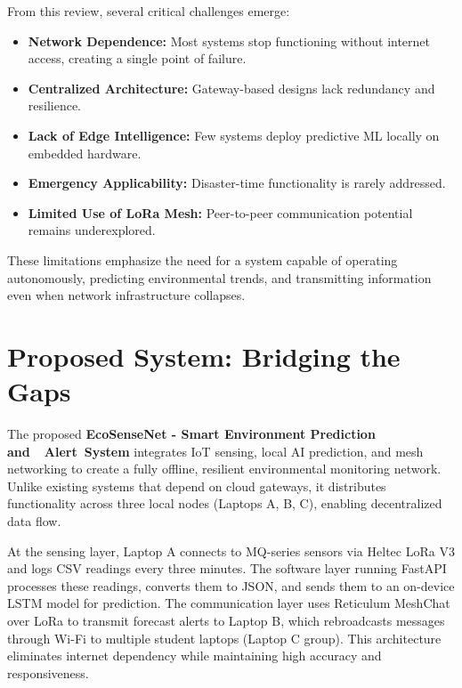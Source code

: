 From this review, several critical challenges emerge:
\begin{itemize}
    \item \textbf{Network Dependence:} Most systems stop functioning without internet access, creating a single point of failure.
    \item \textbf{Centralized Architecture:} Gateway-based designs lack redundancy and resilience.
    \item \textbf{Lack of Edge Intelligence:} Few systems deploy predictive ML locally on embedded hardware.
    \item \textbf{Emergency Applicability:} Disaster-time functionality is rarely addressed.
    \item \textbf{Limited Use of LoRa Mesh:} Peer-to-peer communication potential remains underexplored.
\end{itemize}

These limitations emphasize the need for a system capable of operating autonomously, predicting environmental trends, and transmitting information even when network infrastructure collapses.

\section{Proposed System: Bridging the Gaps}

The proposed \textbf{EcoSenseNet - Smart Environment Prediction and  Alert System} integrates IoT sensing, local AI prediction, and mesh networking to create a fully offline, resilient environmental monitoring network. Unlike existing systems that depend on cloud gateways, it distributes functionality across three local nodes (Laptops A, B, C), enabling decentralized data flow.

At the sensing layer, Laptop A connects to MQ-series sensors via Heltec LoRa V3 and logs CSV readings every three minutes. The software layer running FastAPI processes these readings, converts them to JSON, and sends them to an on-device LSTM model for prediction. The communication layer uses Reticulum MeshChat over LoRa to transmit forecast alerts to Laptop B, which rebroadcasts messages through Wi-Fi to multiple student laptops (Laptop C group). This architecture eliminates internet dependency while maintaining high accuracy and responsiveness.

